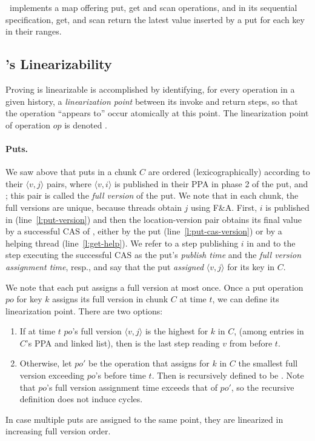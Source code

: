 \kiwi\ implements a map offering put, get and scan operations, and in its sequential specification, get, and scan return the latest value inserted by a put for each key in their ranges.

\subsection{\kiwi's Linearizability}
\label{sec:safe}

Proving {\kiwi} is linearizable is accomplished by identifying, for every operation in a given history, a \emph{linearization point} between its invoke and return steps, so that the operation ``appears to'' occur atomically at this point. 
The linearization point of operation $op$ is denoted . 

\paragraph{Puts.} 

We saw above that puts in a chunk $C$
are ordered (lexicographically) according to their $\langle v, j \rangle$  pairs, where
$\langle v, i \rangle$ is published in their PPA in phase 2 of the put, and ; this pair is called the \emph{full version} of the put.
We note that in each chunk, the full versions are unique, because threads obtain $j$ using F\&A.
First,  $i$ is published in  (line~\ref{l:put-version}) and then
the location-version pair obtains its final value by a successful CAS of , either by the put (line~\ref{l:put-cas-version}) or by a helping thread (line~\ref {l:get-help}). 
We refer to 
a step publishing $i$ in  and to
the step executing the successful CAS  as the put's \emph{publish time} and the \emph{full version assignment time}, resp., 
and say that the put \emph{assigned}  $\langle v, j \rangle$ for its key in $C$.

We note that each put assigns a full version at most once. 
Once a put operation $po$ for key $k$ assigns its full version in chunk $C$ at time $t$, we can define its linearization point. 
There are two options: 
\begin{enumerate}
\setlength{\itemsep}{0pt}
\setlength{\parskip}{0pt}
\item If at time $t$
$po$'s full version $\langle v, j \rangle$ is the highest for $k$ in $C$, (among entries in $C$'s {PPA} and  linked list),
then   is the last step reading $v$ from  before $t$.
\item  Otherwise, let $po'$ be the 
 operation that assigns for $k$ in $C$ the smallest full version exceeding $po$'s
before time $t$. Then  is recursively defined to be . Note that 
$po$'s full version assignment time exceeds that of  $po'$, so the recursive definition does not induce cycles. 
\end{enumerate}
In case multiple puts are assigned to the same point, they are linearized in increasing full version order.

